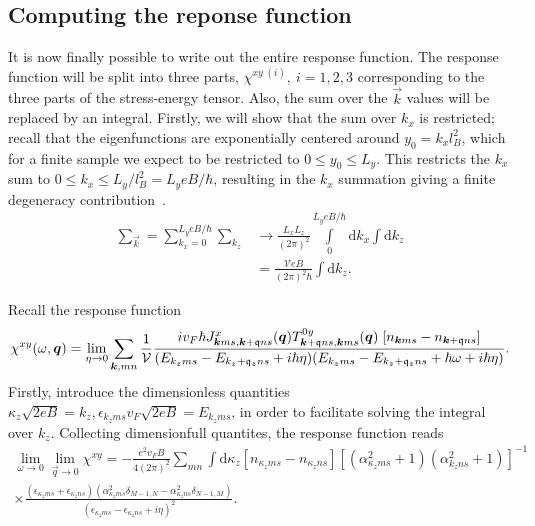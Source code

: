 \subsection{Computing the reponse function}
It is now finally possible to write out the entire response function.
The response function will be split into three parts, $\chi ^{xy\; (i)},\: i = 1,2,3$ corresponding to the three parts of the stress-energy tensor.
Also, the sum over the $\vec{k}$ values will be replaced by an integral.
Firstly, we will show that the sum over $k_x$ is restricted;
recall that the eigenfunctions are exponentially centered around $y_0 = k_x l_B^2$, which for a finite sample we expect to be restricted to $0 \leq y_0 \leq L_y$.
This restricts the $k_x$ sum to $0 \leq k_x \leq L_y / l_B^2 = L_ye B /\hbar $, resulting in the $k_x$ summation giving a finite degeneracy contribution~\cites[Ch.~1.4.1]{tongGaugeTheoryLecture}{linderIntermediateQuantumMechanics2017}.
\begin{align}
  \sum\limits_{\vec{k}}^{} = \sum\limits_{k_x = 0}^{L_y eB / \hbar } \sum\limits_{k_z}^{} &\to 
                                                                                            \frac{L_xL_z}{(2\pi )^2} \int\limits_0^{L_y e B /\hbar } \mathrm{d}k_x \int\mathrm{d}k_z \\
  &= \frac{\mathcal{V} e B}{(2 \pi)^2 \hbar } \int \mathrm{d}k_{z}.
\end{align}

Recall the response function
\begin{equation}
  \chi ^{xy} (\omega , \bm{q}) =
  \lim_{\eta \to 0}
  \sum\limits_{\bm{k}, mn}^{}
  \frac{1}{\mathcal{V}}
  \frac{
    i v_F \hbar J^x_{\bm{k} m s, \bm{k}+\mathfrak{q} n s}(\bm{q})
    T^{0y}_{\bm{k}+\mathfrak{q} ns, \bm{k}ms}(\bm{q})
    \;
    [n_{\bm{k} m s}- n_{\bm{k}+\mathfrak{q} ns }]
  }{
    (E_{k_z m s} - E_{k_z + \mathfrak{q}_z ns} + i \hbar  \eta )
    (E_{k_z m s} - E_{k_z + \mathfrak{q}_z ns} + \hbar \omega + i \hbar  \eta )
  }
  .
\end{equation}
Firstly, introduce the dimensionless quantities \( \kappa_z \sqrt{2 eB} = k_z, \epsilon_{k_z m s} v_F \sqrt{2 e B} = E_{k_z m s}  \), in order to facilitate solving the integral over \( k_z \).
Collecting dimensionfull quantites, the response function reads
\begin{multline}
  \label{eq:61}
\lim_{\omega \to 0} \lim_{\vec{q} \to 0} \chi^{xy} =
  -\frac{e^2 v_F B }{4 (2 \pi)^2}
  \sum\limits_{m n}^{}
  \int \mathrm{d} \kappa_z
  [n_{\kappa_z m s} - n_{\kappa_z n s}]
  [(\alpha_{\kappa_z m s}^2 + 1) (\alpha_{k_z n s}^2 + 1)]^{-1}\\
  \times
  \frac{
    (\epsilon_{\kappa_z m s} + \epsilon_{\kappa_z n s})
    (\alpha_{\kappa_z m s}^2 \delta_{M-1, N} - \alpha_{\kappa_z n s}^2 \delta_{N-1, M})
  }{
    (\epsilon_{\kappa_z m s} - \epsilon_{\kappa_z n s} + i \eta)^2
  }.
\end{multline}

